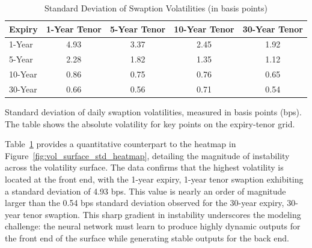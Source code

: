 \begin{table}[H]
	\centering
	\begin{threeparttable}
		\caption{Standard Deviation of Swaption Volatilities (in basis points)}
		\label{tab:vol_std_summary}
		\begin{tabular}{lcccc}
			\toprule
			\textbf{Expiry} & \textbf{1-Year Tenor} & \textbf{5-Year Tenor} & \textbf{10-Year Tenor} & \textbf{30-Year Tenor} \\
			\midrule
			1-Year          & 4.93                  & 3.37                  & 2.45                   & 1.92                   \\
			5-Year          & 2.28                  & 1.82                  & 1.35                   & 1.12                   \\
			10-Year         & 0.86                  & 0.75                  & 0.76                   & 0.65                   \\
			30-Year         & 0.66                  & 0.56                  & 0.71                   & 0.54                   \\
			\bottomrule
		\end{tabular}
		\begin{tablenotes}
			\footnotesize
			\item  Standard deviation of daily swaption volatilities, measured in basis points (bps). The table shows the absolute volatility for key points on the expiry-tenor grid.
		\end{tablenotes}
	\end{threeparttable}
\end{table}


Table~\ref{tab:vol_std_summary} provides a quantitative counterpart to the heatmap in Figure~\ref{fig:vol_surface_std_heatmap}, detailing the magnitude of instability across the volatility surface. The data confirms that the highest volatility is located at the front end, with the 1-year expiry, 1-year tenor swaption exhibiting a standard deviation of 4.93 bps. This value is nearly an order of magnitude larger than the 0.54 bps standard deviation observed for the 30-year expiry, 30-year tenor swaption. This sharp gradient in instability underscores the modeling challenge: the neural network must learn to produce highly dynamic outputs for the front end of the surface while generating stable outputs for the back end.

